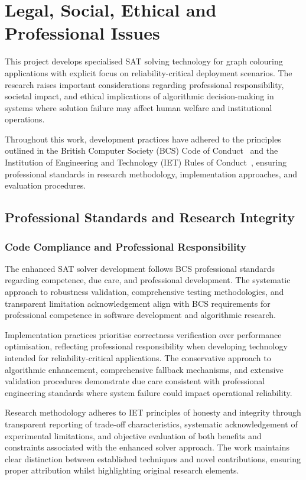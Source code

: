 \section{Legal, Social, Ethical and Professional Issues}

This project develops specialised SAT solving technology for graph colouring applications with explicit focus on reliability-critical deployment scenarios. The research raises important considerations regarding professional responsibility, societal impact, and ethical implications of algorithmic decision-making in systems where solution failure may affect human welfare and institutional operations.

Throughout this work, development practices have adhered to the principles outlined in the British Computer Society (BCS) Code of Conduct~\cite{bcs2022code} and the Institution of Engineering and Technology (IET) Rules of Conduct~\cite{iet2023rules}, ensuring professional standards in research methodology, implementation approaches, and evaluation procedures.

\subsection{Professional Standards and Research Integrity}

\subsubsection{Code Compliance and Professional Responsibility}

The enhanced SAT solver development follows BCS professional standards regarding competence, due care, and professional development. The systematic approach to robustness validation, comprehensive testing methodologies, and transparent limitation acknowledgement align with BCS requirements for professional competence in software development and algorithmic research.

Implementation practices prioritise correctness verification over performance optimisation, reflecting professional responsibility when developing technology intended for reliability-critical applications. The conservative approach to algorithmic enhancement, comprehensive fallback mechanisms, and extensive validation procedures demonstrate due care consistent with professional engineering standards where system failure could impact operational reliability.

Research methodology adheres to IET principles of honesty and integrity through transparent reporting of trade-off characteristics, systematic acknowledgement of experimental limitations, and objective evaluation of both benefits and constraints associated with the enhanced solver approach. The work maintains clear distinction between established techniques and novel contributions, ensuring proper attribution whilst highlighting original research elements.

